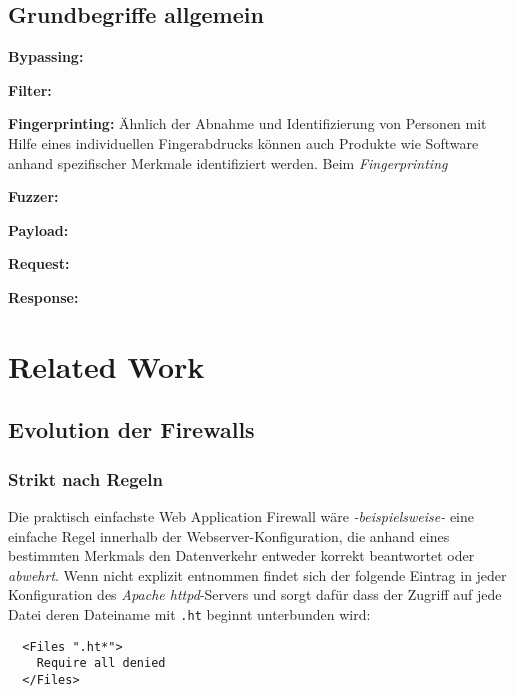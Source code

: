 \subsection{Grundbegriffe allgemein}

\textbf{Bypassing:}

\textbf{Filter:}

\textbf{Fingerprinting:} Ähnlich der Abnahme und Identifizierung von Personen mit Hilfe eines individuellen Fingerabdrucks können auch Produkte wie Software anhand spezifischer Merkmale identifiziert werden. Beim \emph{Fingerprinting}

\textbf{Fuzzer:}

\textbf{Payload:}

\textbf{Request:} 

\textbf{Response:}

\section{Related Work} %

\subsection{Evolution der Firewalls}

\subsubsection{Strikt nach Regeln}

Die praktisch einfachste Web Application Firewall wäre \emph{-beispielsweise-} eine einfache Regel innerhalb der Webserver-Konfiguration, die anhand eines bestimmten Merkmals den Datenverkehr entweder korrekt beantwortet oder \glqq\emph{abwehrt}\grqq. Wenn nicht explizit entnommen findet sich der folgende Eintrag in jeder Konfiguration des \emph{Apache httpd}-Servers und sorgt dafür dass der Zugriff auf jede Datei deren Dateiname mit \texttt{.ht} beginnt unterbunden wird:

\begin{lstlisting}
  <Files ".ht*">
    Require all denied
  </Files>
\end{lstlisting}

